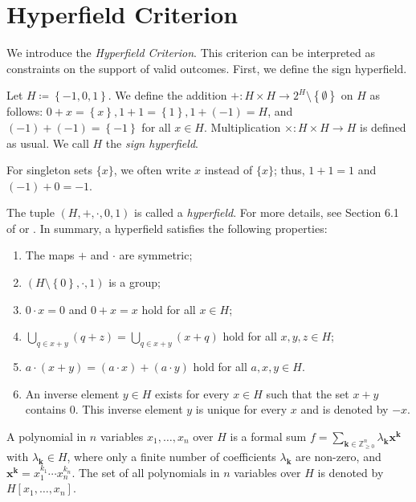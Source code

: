 \chapter{Hyperfield Criterion}

We introduce the \emph{Hyperfield Criterion}. This criterion can be interpreted as constraints on the support of valid outcomes. First, we define the {sign hyperfield}.

\begin{definition}
    Let \( H \coloneqq \left\{ -1, 0, 1 \right\} \). We define the addition \( + : H \times H \to 2^H \setminus \left\{ \emptyset \right\} \) on \( H \) as follows: \( 0 + x = \left\{ x \right\},  1 + 1 = \left\{ 1 \right\},1 + (-1) = H \), and \( (-1) + (-1) = \left\{ -1 \right\} \) for all \( x \in H \).
    Multiplication \( \times : H \times H \to H \) is defined as usual. We call \( H \) the \emph{sign hyperfield}.
\end{definition}

For singleton sets \( \{ x \} \), we often write \( x \) instead of \( \{ x \} \); thus, \( 1 + 1 = 1 \) and \( (-1) + 0 = -1 \).

\begin{remark}
    The tuple \( (H, + , \cdot, 0, 1) \) is called a \emph{hyperfield}. For more details, see Section 6.1 of \cite{bik2022classifying} or \cite{baker2018matroids}. In summary, a hyperfield satisfies the following properties:
    \begin{enumerate}
        \item  The maps \( + \) and \( \cdot \) are symmetric;
        \item \( (H \setminus \left\{ 0 \right\}, \cdot, 1) \) is a group;
        \item \( 0 \cdot x = 0 \) and \( 0 + x = x \) hold for all \( x \in H \);
        \item \( \bigcup_{q \in x+y}(q + z) = \bigcup_{q \in x + y}(x + q) \) hold for all \( x,y,z \in H \);
        \item \( a \cdot (x + y) = (a \cdot x) + (a \cdot y) \) hold for all \( a,x,y \in H \).
        \item An inverse element \( y  \in H\) exists for every \( x \in H\) such that the set \( x + y \) contains \( 0 \). This inverse element \( y \) is unique for every \( x \) and is denoted by \( -x \).
    \end{enumerate}
\end{remark}

\begin{definition}
    A polynomial in \( n \) variables \( x_1, \dots, x_n \) over \( H \) is a formal sum \( f= \sum_{\mathbf{k} \in \mathbb{Z}^n_{\geq 0}} \lambda_{\mathbf{k}} \mathbf{x}^{\mathbf{k}} \) with \( \lambda_{\mathbf{k}} \in H \),
    where only a finite number of coefficients \( \lambda_{\mathbf{k}} \) are non-zero, and \( \mathbf{x}^{\mathbf{k}} = x_1^{k_1} \cdots x_n^{k_n} \). The set of all polynomials in \( n \) variables over \( H \) is denoted by \( H[x_1, \dots, x_n] \).
\end{definition}

